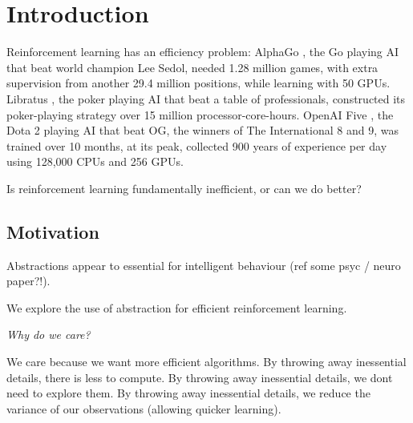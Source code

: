 \chapter{Introduction}\label{C:intro}

Reinforcement learning has an efficiency problem: AlphaGo \cite{Silver2016a}, the Go
playing AI that beat world champion Lee Sedol, needed 1.28 million games, with
extra supervision from another 29.4 million positions, while learning with 50 GPUs.
Libratus \cite{Brown2018b}, the poker playing AI that beat a table of professionals,
constructed its poker-playing strategy over 15 million processor-core-hours.
OpenAI Five \cite{Berner2019}, the Dota 2 playing AI that beat OG, the winners of The International 8 and 9, was
trained over 10 months, at its peak, collected 900 years of experience per day using
128,000 CPUs and 256 GPUs.

Is reinforcement learning fundamentally inefficient, or can we do better?

\section{Motivation}


Abstractions appear to essential for intelligent behaviour (ref some psyc / neuro paper?!).

We explore the use of abstraction for efficient reinforcement learning.






\begin{displayquote}
 \textit{Why do we care?}
\end{displayquote}

We care because we want more efficient algorithms.
By throwing away inessential details, there is less to compute.
By throwing away inessential details, we dont need to explore them.
By throwing away inessential details, we reduce the variance of our
observations (allowing quicker learning).


